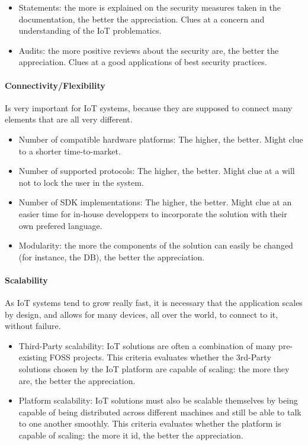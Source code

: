 \documentclass{article}
\begin{document}
\begin{itemize}
\item Statements: the more is explained on the security measures taken in the documentation, the better the appreciation. Clues at a concern and understanding of the IoT problematics.
\item Audits: the more positive reviews about the security are, the better the appreciation. Clues at a good applications of best security practices.
\end{itemize}

\paragraph{Connectivity/Flexibility} Is very important for IoT systems, because they are supposed to connect many elements that are all very different.

\begin{itemize}
\item Number of compatible hardware platforms: The higher, the better. Might clue to a shorter time-to-market.
\item Number of supported protocols: The higher, the better. Might clue at a will not to lock the user in the system.
\item Number of SDK implementations: The higher, the better. Might clue at an easier time for in-house developpers to incorporate the solution with their own prefered language.
\item Modularity: the more the components of the solution can easily be changed (for instance, the DB), the better the appreciation.
\end{itemize}

\paragraph{Scalability} As IoT systems tend to grow really fast, it is necessary that the application scales by design, and allows for many devices, all over the world, to connect to it, without failure.

\begin{itemize}
\item Third-Party scalability: IoT solutions are often a combination of many pre-existing FOSS projects. This criteria evaluates whether the 3rd-Party solutions chosen by the IoT platform are capable of scaling: the more they are, the better the appreciation.
\item Platform scalability: IoT solutions must also be scalable themselves by being capable of being distributed across different machines and still be able to talk to one another smoothly. This criteria evaluates whether the platform is capable of scaling: the more it id, the better the appreciation.
\end{itemize}
\end{document}
